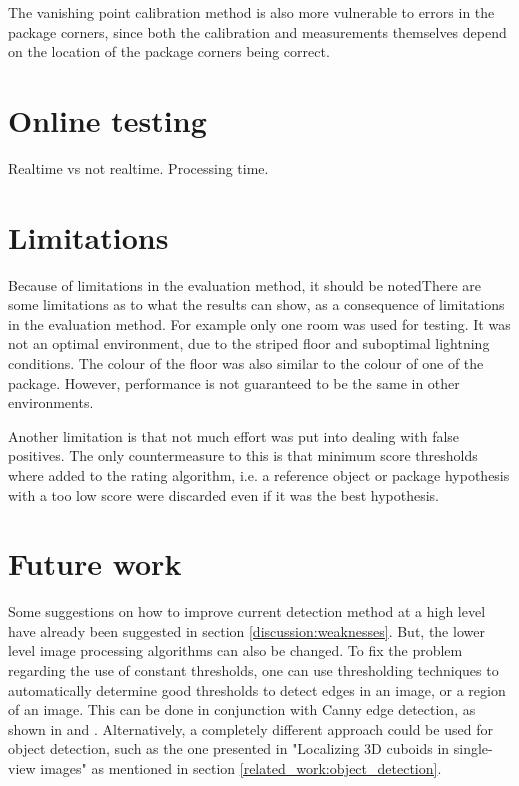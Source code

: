 The vanishing point calibration method is also more vulnerable to errors in the package corners, since both the calibration and measurements themselves depend on the location of the package corners being correct.


\section{Online testing}
Realtime vs not realtime. Processing time. %

\section{Limitations}
Because of limitations in the evaluation method, it should be notedThere are some limitations as to what the results can show, as a consequence of limitations in the evaluation method.
For example only one room was used for testing.
It was not an optimal environment, due to the striped floor and suboptimal lightning conditions.
The colour of the floor was also similar to the colour of one of the package.
However, performance is not guaranteed to be the same in other environments.

Another limitation is that not much effort was put into dealing with false positives.
The only countermeasure to this is that minimum score thresholds where added to the rating algorithm, i.e. a reference object or package hypothesis with a too low score were discarded even if it was the best hypothesis.

\section{Future work} \label{discussion:future_work}
Some suggestions on how to improve current detection method at a high level have already been suggested in section \ref{discussion:weaknesses}.
But, the lower level image processing algorithms can also be changed.
To fix the problem regarding the use of constant thresholds, one can use thresholding techniques to automatically determine good thresholds to detect edges in an image, or a region of an image.
This can be done in conjunction with Canny edge detection, as shown in \cite{wang2005fast} and \cite{liu2004automated}.
Alternatively, a completely different approach could be used for object detection, such as the one presented in "Localizing 3D cuboids in single-view images" as mentioned in section \ref{related_work:object_detection}.

